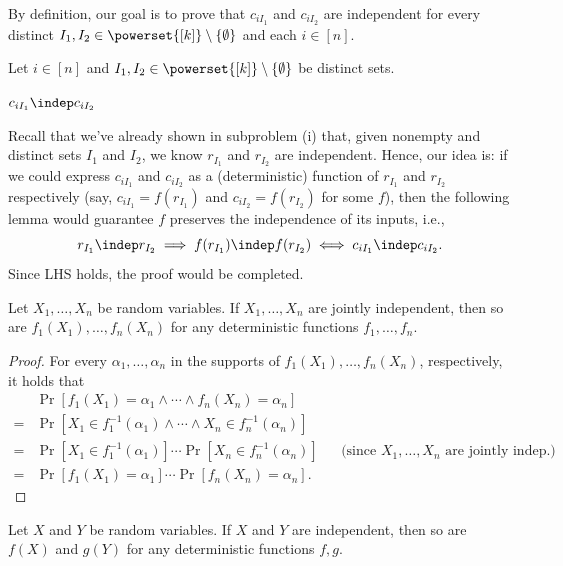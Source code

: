 \begin{answer}[ii]
    By definition, our goal is to prove that $c_{iI_1}$ and $c_{iI_2}$ are independent for every distinct $I_1,I_2\in \powerset{[k]}\setminus \{\emptyset\}$ and each $i\in [n]$.
    
    Let $i\in [n]$ and $I_1,I_2\in \powerset{[k]}\setminus \{\emptyset\}$ be distinct sets.
    \begin{goal}
        $c_{iI_1} \indep c_{iI_2}$
    \end{goal}
    \begin{idea}
        Recall that we've already shown in subproblem (i) that, given nonempty and distinct sets $I_1$ and $I_2$, we know $r_{I_1}$ and $r_{I_2}$ are independent. Hence, our idea is: if we could express $c_{iI_1}$ and $c_{iI_2}$ as a (deterministic) function of $r_{I_1}$ and $r_{I_2}$ respectively (say, $c_{iI_1}=f(r_{I_1})$ and $c_{iI_2}=f(r_{I_2})$ for some $f$), then the following lemma would guarantee $f$ preserves the independence of its inputs, i.e.,
        \[
            r_{I_1}\indep r_{I_2} \implies f(r_{I_1}) \indep f(r_{I_2}) 
            \iff  c_{iI_1} \indep c_{iI_2}.
        \]
        Since LHS holds, the proof would be completed.
    \end{idea}
    \begin{lemma}\label{lemma:p7-2-0}
        Let $X_1,\ldots,X_n$ be random variables. If $X_1,\ldots,X_n$  are jointly independent, then so are $f_1(X_1),\ldots, f_n(X_n)$ for any deterministic functions $f_1,\ldots, f_n$.
    \end{lemma}
    \begin{proof}
        For every $\alpha_1,\ldots, \alpha_n$ in the supports of $f_1(X_1),\ldots,f_n(X_n)$, respectively, it holds that
        \begin{align*}
            &\Pr[f_1(X_1)=\alpha_1 \land \cdots \land f_n(X_n)=\alpha_n]\\
            =& \Pr[X_1\in f_1^{-1}(\alpha_1) \land \cdots \land X_n\in f_n^{-1}(\alpha_n)]\\
            =& \Pr[X_1\in f_1^{-1}(\alpha_1)] \cdots \Pr[X_n\in f_n^{-1}(\alpha_n)]
            &&\textrm{(since $X_1,\ldots,X_n$  are jointly indep.)}\\
            =& \Pr[f_1(X_1)=\alpha_1] \cdots \Pr[ f_n(X_n)=\alpha_n].
        \end{align*}
    \end{proof}
    \begin{corollary}\label{lemma:p7-2-1}
        Let $X$ and $Y$ be random variables. If $X$ and $Y$ are independent, then so are $f(X)$ and $g(Y)$ for any deterministic functions $f,g$.
    \end{corollary}


\end{answer}
